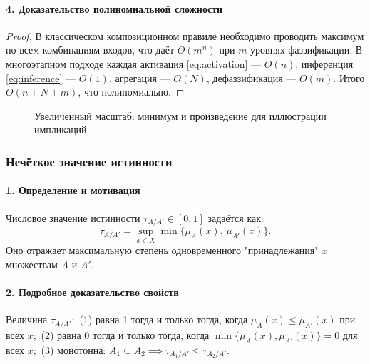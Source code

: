 \paragraph{4. Доказательство полиномиальной сложности}
\begin{proof}
В классическом композиционном правиле необходимо проводить
максимум по всем комбинациям входов, что даёт $O(m^n)$ при $m$
уровнях фаззификации. В многоэтапном подходе каждая активация
\eqref{eq:activation} — $O(n)$, инференция \eqref{eq:inference} — $O(1)$,
агрегация — $O(N)$, дефаззификация — $O(m)$. Итого $O(n+N+m)$,
что полиномиально.
\end{proof}

\begin{figure}[h!]
  \centering
  \caption{Увеличенный масштаб: минимум и произведение
    для иллюстрации импликаций.}
  \label{fig:implications_large2}
\end{figure}

\subsubsection{Нечёткое значение истинности}

\paragraph{1. Определение и мотивация}
Числовое значение истинности
\(\tau_{A/A'}\in[0,1]\)
задаётся как:
\begin{equation}
  \tau_{A/A'}
  = \sup_{x\in X}\min\{\mu_A(x),\,\mu_{A'}(x)\}.
  \label{eq:tau_def3b}
\end{equation}
Оно отражает максимальную степень одновременного
"принадлежания" $x$ множествам $A$ и $A'$.

\paragraph{2. Подробное доказательство свойств}
\begin{theorem}
Величина $\tau_{A/A'}$:\
(1) равна 1 тогда и только тогда, когда
$\mu_A(x)\le\mu_{A'}(x)$ при всех $x$;\
(2) равна 0 тогда и только тогда,
когда $\min\{\mu_A(x),\mu_{A'}(x)\}=0$ для всех $x$;\
(3) монотонна:
$A_1\subseteq A_2\implies \tau_{A_1/A'}\le \tau_{A_2/A'}$.
\end{theorem}

